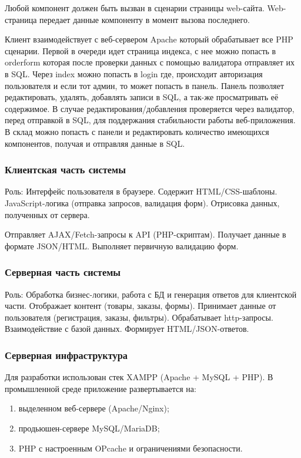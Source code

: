 Любой компонент должен быть вызван в сценарии страницы web-сайта. Web-страница передает данные компоненту в момент вызова последнего.

Клиент взаимодействует с веб-сервером Apache который обрабатывает все PHP сценарии. Первой в очереди идет страница индекса, с нее можно попасть в orderform которая после проверки данных с помощью валидатора отправляет их в SQL. Через index можно попасть в login где, происходит авторизация пользователя и если тот админ, то может попасть в панель. Панель позволяет редактировать, удалять, добавлять записи в SQL, а так-же просматривать её содержимое. В случае редактирования/добавления проверяется через валидатор, перед отправкой в SQL, для поддержания стабильности работы веб-приложения. В склад можно попасть с панели и редактировать количество имеющихся компонентов, получая и отправляя данные в SQL.
\newpage

\subsubsection{Клиентская часть системы}
Роль: Интерфейс пользователя в браузере.
Содержит HTML/CSS-шаблоны.
JavaScript-логика (отправка запросов, валидация форм).
Отрисовка данных, полученных от сервера.

Отправляет AJAX/Fetch-запросы к API (PHP-скриптам).
Получает данные в формате JSON/HTML.
Выполняет первичную валидацию форм.

\subsubsection{Серверная часть системы}
Роль: Обработка бизнес-логики, работа с БД и генерация ответов для клиентской части.
Отображает контент (товары, заказы, формы).
Принимает данные от пользователя (регистрация, заказы, фильтры).
Обрабатывает http-запросы.
Взаимодействие с базой данных.
Формирует HTML/JSON-ответов.

\subsubsection{Серверная инфраструктура}
Для разработки использован стек XAMPP (Apache + MySQL + PHP). В промышленной среде приложение развертывается на:
\begin{enumerate}
	\item выделенном веб-сервере (Apache/Nginx);
	\item продьюшен-сервере MySQL/MariaDB;
	\item PHP с настроенным OPcache и ограничениями безопасности.
\end{enumerate}

